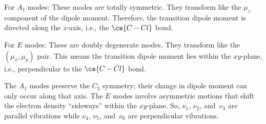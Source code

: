 \begin{solution}\leavevmode
  \begin{enumext}
    \item \begin{enumext}
      \item For $A_1$ modes: These modes are totally symmetric.
      They transform like the $\mu_z$ component of the dipole moment.
      Therefore, the transition dipole moment is directed along the $z$-axis,
      i.e., the $\ce{C-Cl}$ bond.
      \item For $E$ modes: These are doubly degenerate modes.
      They transform like the $(\mu_x, \mu_y)$ pair.
      This means the transition dipole moment lies within the $xy$-plane, i.e.,
      perpendicular to the $\ce{C-Cl}$ bond.
    \end{enumext}
    \item The $A_1$ modes preserve the $C_3$ symmetry; their change in dipole
    moment can only occur along that axis. The $E$ modes involve asymmetric
    motions that shift the electron density ``sideways'' within the $xy$-plane.
    So, $\nu_1$, $\nu_2$, and~$\nu_3$ are parallel vibrations while
    $\nu_4$, $\nu_5$, and~$\nu_6$ are perpendicular vibrations.
  \end{enumext}
\end{solution}